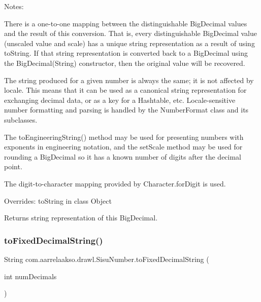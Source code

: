 Notes\+: 

There is a one-\/to-\/one mapping between the distinguishable Big\+Decimal values and the result of this conversion. That is, every distinguishable Big\+Decimal value (unscaled value and scale) has a unique string representation as a result of using to\+String. If that string representation is converted back to a Big\+Decimal using the Big\+Decimal(\+String) constructor, then the original value will be recovered. 

The string produced for a given number is always the same; it is not affected by locale. This means that it can be used as a canonical string representation for exchanging decimal data, or as a key for a Hashtable, etc. Locale-\/sensitive number formatting and parsing is handled by the Number\+Format class and its subclasses. 

The to\+Engineering\+String() method may be used for presenting numbers with exponents in engineering notation, and the set\+Scale method may be used for rounding a Big\+Decimal so it has a known number of digits after the decimal point. 

The digit-\/to-\/character mapping provided by Character.\+for\+Digit is used. 

Overrides\+: to\+String in class Object

\begin{DoxyReturn}{Returns}
string representation of this Big\+Decimal. 
\end{DoxyReturn}
\mbox{\label{classcom_1_1aarrelaakso_1_1drawl_1_1_sisu_number_a3d8585ae00c288b063998e0c65950333}} 
\subsubsection{\texorpdfstring{to\+Fixed\+Decimal\+String()}{toFixedDecimalString()}}
{\footnotesize\ttfamily String com.\+aarrelaakso.\+drawl.\+Sisu\+Number.\+to\+Fixed\+Decimal\+String (\begin{DoxyParamCaption}\item[{int}]{num\+Decimals }\end{DoxyParamCaption})\hspace{0.3cm}{\ttfamily [protected]}}



